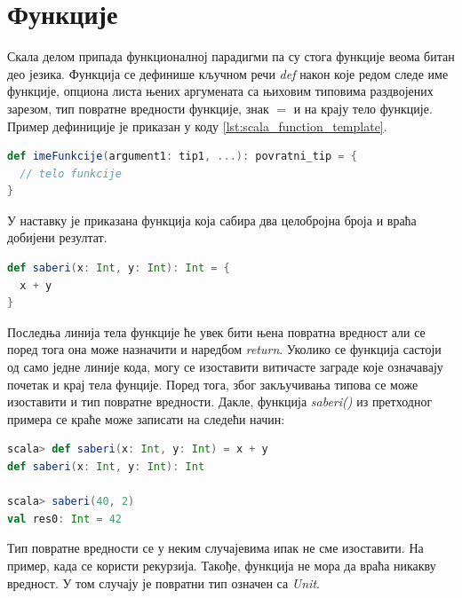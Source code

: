 \documentclass[12pt,oneside]{memoir}
\begin{document}
\section{Функције}
\label{sec:scala_funk}

Скала делом припада функционалној парадигми па су стога функције веома битан део језика. Функција се дефинише кључном речи \textit{def} након које редом следе име функције, опциона листа њених аргумената са њиховим типовима раздвојених зарезом, тип повратне вредности функције, знак $=$ и на крају тело функције. Пример дефиниције је приказан у коду \ref{lst:scala_function_template}.

\begin{lstlisting}[language=Scala, caption={Дефиниција фунције у скали}, label={lst:scala_function_template}]
def imeFunkcije(argument1: tip1, ...): povratni_tip = {
  // telo funkcije
}

\end{lstlisting}

У наставку је приказана функција која сабира два целобројна броја и враћа добијени резултат. 

\begin{lstlisting}[language=Scala, caption={Пример функције}, label={lst:scala_function_add_example}]
def saberi(x: Int, y: Int): Int = {
  x + y
}
\end{lstlisting}

Последња линија тела функције ће увек бити њена повратна вредност али се поред тога она може назначити и наредбом \textit{return}. Уколико се функција састоји од само једне линије кода, могу се изоставити витичасте заграде које означавају почетак и крај тела фунције. Поред тога, због закључивања типова се може изоставити и тип повратне вредности. Дакле, функција \textit{saberi()} из претходног примера се краће може записати на следећи начин:

\begin{lstlisting}[language=Scala, caption={Краћи запис функције saberi()}, label={lst:scala_function_add_example_simplified}]
scala> def saberi(x: Int, y: Int) = x + y
def saberi(x: Int, y: Int): Int

scala> saberi(40, 2)
val res0: Int = 42
\end{lstlisting}

Тип повратне вредности се у неким случајевима ипак не сме изоставити. На пример, када се користи рекурзија. Такође, функција не мора да враћа никакву вредност. У том случају је повратни тип означен са \textit{Unit}. \cite{scala_prog}
\end{document}
